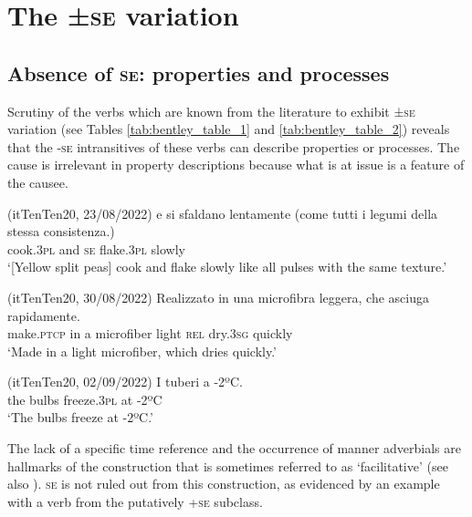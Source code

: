 \documentclass[output=paper,colorlinks,citecolor=brown
]{langscibook}
\begin{document}
\section{The ±\textsc{se} variation}
\label{bentley_section_4}
\subsection{Absence of \textsc{se}: properties and processes}
\label{bentley_section_4.1}
Scrutiny of the verbs which are known from the literature to exhibit ±\textsc{se} variation (see Tables \ref{tab:bentley_table_1} and \ref{tab:bentley_table_2}) reveals that the -\textsc{se} intransitives of these verbs can describe properties or processes. The cause is irrelevant in property descriptions because what is at issue is a feature of the causee. 

\hspace*{\fill}(itTenTen20, 23/08/2022)\quad
\ea \label{bentley_example_20}
    \gll {} e			si		sfaldano		lentamente (come tutti i legumi della stessa consistenza.)    \\
    cook.3\textsc{pl}		and	\textsc{se}		flake.3\textsc{pl}		slowly {}\\
    \glt ‘[Yellow split peas] cook and flake slowly like all pulses with the same texture.’
\z

\hspace*{\fill}(itTenTen20, 30/08/2022)\quad
\ea \label{bentley_example_21}
    \gll Realizzato	in una microfibra		leggera,	che			asciuga		rapidamente. \\
    make.\textsc{ptcp}	in	a				microfiber		light				\textsc{rel}		dry.3\textsc{sg}		quickly \\
    \glt ‘Made in a light microfiber, which dries quickly.’
\z

\hspace*{\fill}(itTenTen20, 02/09/2022)\quad
\ea \label{bentley_example_22}
    \gll I tuberi  a -2ºC.\\
    	the		bulbs		freeze.3\textsc{pl}		at		-2ºC \\
    \glt ‘The bulbs freeze at -2ºC.’
\z


The lack of a specific time reference and the occurrence of manner adverbials are hallmarks of the construction that is sometimes referred to as ‘facilitative’ \citep[147—149]{kemmer1993middle} (see also \cite[25—26]{levin1993english}). \textsc{se} is not ruled out from this construction, as evidenced by an example with a verb from the putatively +\textsc{se} subclass.
\end{document}
